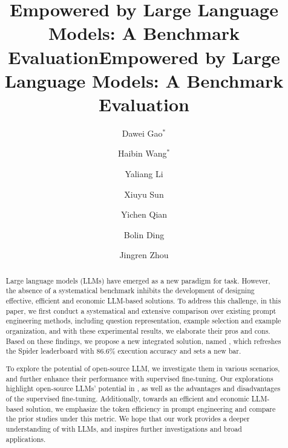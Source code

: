 \title{\nlsql Empowered by Large Language Models: A Benchmark Evaluation}



\title{\nlsql Empowered by Large Language Models: A Benchmark Evaluation}

\author{Dawei Gao$^*$}

\author{Haibin Wang$^*$}

\author{Yaliang Li}

\author{Xiuyu Sun}

\author{Yichen Qian}

\author{Bolin Ding}

\author{Jingren Zhou}

\begin{abstract}
Large language models (LLMs) have emerged as a new paradigm for \nlsql task. 
However, the absence of a systematical benchmark inhibits the development of designing effective, efficient and economic LLM-based \nlsql solutions. 
To address this challenge, in this paper, we first conduct a systematical and extensive comparison over existing prompt engineering methods, including question representation, example selection and example organization, and with these experimental results, we elaborate their pros and cons. 
Based on these findings, we propose a new integrated solution, named \ours, which refreshes the Spider leaderboard with $86.6\%$ execution accuracy and sets a new bar. 

To explore the potential of open-source LLM, we investigate them in various scenarios, and further enhance their performance with supervised fine-tuning. 
Our explorations highlight open-source LLMs' potential in \nlsql, as well as the advantages and disadvantages of the supervised fine-tuning. 
Additionally, towards an efficient and economic LLM-based \nlsql solution, we emphasize the token efficiency in prompt engineering and compare the prior studies under this metric. 
We hope that our work provides a deeper understanding of \nlsql with LLMs, and inspires further investigations and broad applications.
\end{abstract}\maketitle
\renewcommand*{\thefootnote}{\fnsymbol{footnote}}

